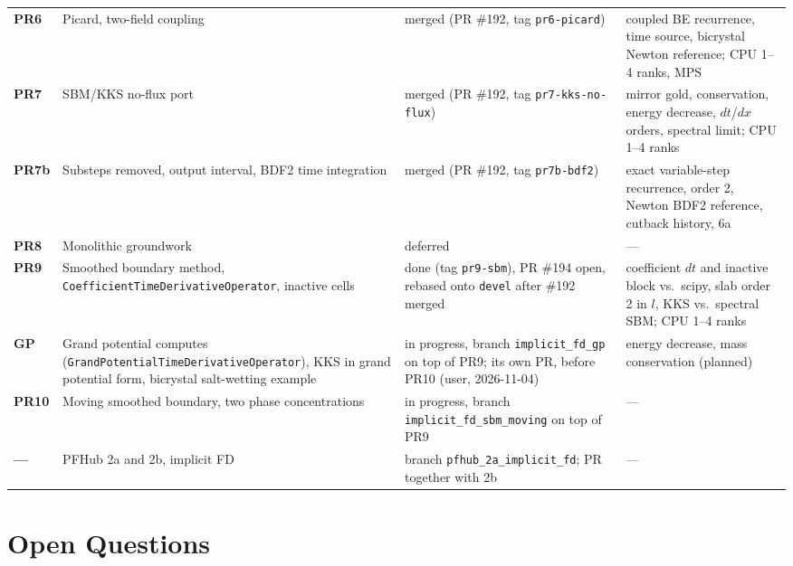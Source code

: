 \documentclass[11pt]{article}
\begin{document}
\begin{longtable}{>{\bfseries}p{} p{} p{} p{}}
PR6 & Picard, two-field coupling & merged (PR \#192, tag \texttt{pr6-picard}) & coupled BE recurrence, time source, bicrystal Newton reference; CPU 1--4 ranks, MPS \\
PR7 & SBM/KKS no-flux port & merged (PR \#192, tag \texttt{pr7-kks-no-flux}) & mirror gold, conservation, energy decrease, $dt$/$dx$ orders, spectral limit; CPU 1--4 ranks \\
PR7b & Substeps removed, output interval, BDF2 time integration & merged (PR \#192, tag \texttt{pr7b-bdf2}) & exact variable-step recurrence, order 2, Newton BDF2 reference, cutback history, 6a \\
PR8 & Monolithic groundwork & deferred & --- \\
PR9 & Smoothed boundary method, \texttt{CoefficientTimeDerivativeOperator}, inactive cells & done (tag \texttt{pr9-sbm}), PR \#194 open, rebased onto \texttt{devel} after \#192 merged & coefficient $dt$ and inactive block vs.\ scipy, slab order 2 in $l$, KKS vs.\ spectral SBM; CPU 1--4 ranks \\
GP & Grand potential computes (\texttt{GrandPotentialTimeDerivativeOperator}), KKS in grand potential form, bicrystal salt-wetting example & in progress, branch \texttt{implicit\_fd\_gp} on top of PR9; its own PR, before PR10 (user, 2026-11-04) & energy decrease, mass conservation (planned) \\
PR10 & Moving smoothed boundary, two phase concentrations & in progress, branch \texttt{implicit\_fd\_sbm\_moving} on top of PR9 & --- \\
--- & PFHub 2a and 2b, implicit FD & branch \texttt{pfhub\_2a\_implicit\_fd}; PR together with 2b & --- \\
\bottomrule
\end{longtable}

\section{Open Questions}
\end{document}

